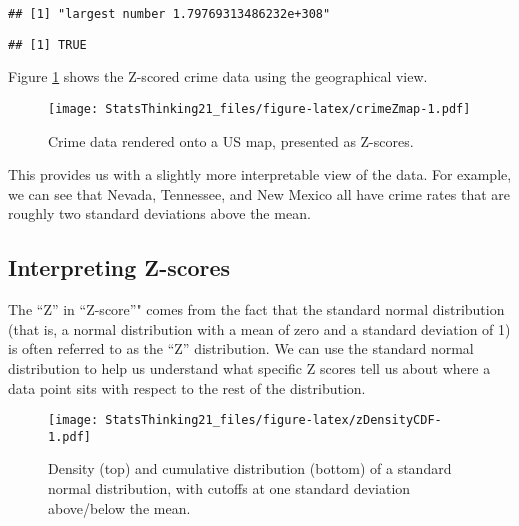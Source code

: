\documentclass[]{book}
\newenvironment{Shaded}{\begin{snugshade}}{\end{snugshade}}
\newcommand{\KeywordTok}[1]{\textcolor[rgb]{0.13,0.29,0.53}{\textbf{#1}}}
\newcommand{\DecValTok}[1]{\textcolor[rgb]{0.00,0.00,0.81}{#1}}
\newcommand{\StringTok}[1]{\textcolor[rgb]{0.31,0.60,0.02}{#1}}
\newcommand{\CommentTok}[1]{\textcolor[rgb]{0.56,0.35,0.01}{\textit{#1}}}
\newcommand{\OperatorTok}[1]{\textcolor[rgb]{0.81,0.36,0.00}{\textbf{#1}}}
\newcommand{\NormalTok}[1]{#1}
\theoremstyle{definition}
\theoremstyle{definition}
\theoremstyle{definition}
\theoremstyle{remark}
\begin{document}
\begin{verbatim}
## [1] "largest number 1.79769313486232e+308"
\end{verbatim}

\begin{Shaded}
\end{Shaded}

\begin{verbatim}
## [1] TRUE
\end{verbatim}

Figure \ref{fig:crimeZmap} shows the Z-scored crime data using the
geographical view.

\begin{figure}
\centering
\texttt{[image: StatsThinking21\_files/figure-latex/crimeZmap-1.pdf]}
\caption{\label{fig:crimeZmap}Crime data rendered onto a US map, presented
as Z-scores.}
\end{figure}

This provides us with a slightly more interpretable view of the data.
For example, we can see that Nevada, Tennessee, and New Mexico all have
crime rates that are roughly two standard deviations above the mean.

\subsection{Interpreting Z-scores}\label{interpreting-z-scores}

The ``Z'' in ``Z-score''" comes from the fact that the standard normal
distribution (that is, a normal distribution with a mean of zero and a
standard deviation of 1) is often referred to as the ``Z'' distribution.
We can use the standard normal distribution to help us understand what
specific Z scores tell us about where a data point sits with respect to
the rest of the distribution.

\begin{figure}
\centering
\texttt{[image: StatsThinking21\_files/figure-latex/zDensityCDF-1.pdf]}
\caption{\label{fig:zDensityCDF}Density (top) and cumulative distribution
(bottom) of a standard normal distribution, with cutoffs at one standard
deviation above/below the mean.}
\end{figure}
\end{document}
